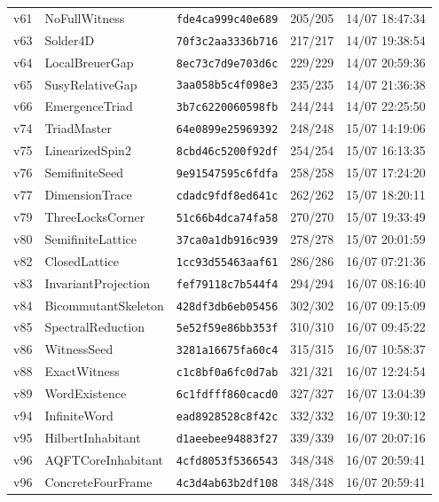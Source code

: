 \documentclass[11pt]{article}
\theoremstyle{definition}\newtheorem{deriv}{Derivação}
\begin{document}
{\begin{longtable}{@{}lllll@{}}
v61 & NoFullWitness & \texttt{fde4ca999c40e689} & 205/205 & 14/07 18:47:34 \\
v63 & Solder4D & \texttt{70f3c2aa3336b716} & 217/217 & 14/07 19:38:54 \\
v64 & LocalBreuerGap & \texttt{8ec73c7d9e703d6c} & 229/229 & 14/07 20:59:36 \\
v65 & SusyRelativeGap & \texttt{3aa058b5c4f098e3} & 235/235 & 14/07 21:36:38 \\
v66 & EmergenceTriad & \texttt{3b7c6220060598fb} & 244/244 & 14/07 22:25:50 \\
v74 & TriadMaster & \texttt{64e0899e25969392} & 248/248 & 15/07 14:19:06 \\
v75 & LinearizedSpin2 & \texttt{8cbd46c5200f92df} & 254/254 & 15/07 16:13:35 \\
v76 & SemifiniteSeed & \texttt{9e91547595c6fdfa} & 258/258 & 15/07 17:24:20 \\
v77 & DimensionTrace & \texttt{cdadc9fdf8ed641c} & 262/262 & 15/07 18:20:11 \\
v79 & ThreeLocksCorner & \texttt{51c66b4dca74fa58} & 270/270 & 15/07 19:33:49 \\
v80 & SemifiniteLattice & \texttt{37ca0a1db916c939} & 278/278 & 15/07 20:01:59 \\
v82 & ClosedLattice & \texttt{1cc93d55463aaf61} & 286/286 & 16/07 07:21:36 \\
v83 & InvariantProjection & \texttt{fef79118c7b544f4} & 294/294 & 16/07 08:16:40 \\
v84 & BicommutantSkeleton & \texttt{428df3db6eb05456} & 302/302 & 16/07 09:15:09 \\
v85 & SpectralReduction & \texttt{5e52f59e86bb353f} & 310/310 & 16/07 09:45:22 \\
v86 & WitnessSeed & \texttt{3281a16675fa60c4} & 315/315 & 16/07 10:58:37 \\
v88 & ExactWitness & \texttt{c1c8bf0a6fc0d7ab} & 321/321 & 16/07 12:24:54 \\
v89 & WordExistence & \texttt{6c1fdfff860cacd0} & 327/327 & 16/07 13:04:39 \\
v94 & InfiniteWord & \texttt{ead8928528c8f42c} & 332/332 & 16/07 19:30:12 \\
v95 & HilbertInhabitant & \texttt{d1aeebee94883f27} & 339/339 & 16/07 20:07:16 \\
v96 & AQFTCoreInhabitant & \texttt{4cfd8053f5366543} & 348/348 & 16/07 20:59:41 \\
v96 & ConcreteFourFrame & \texttt{4c3d4ab63b2df108} & 348/348 & 16/07 20:59:41 \\

\end{longtable}}
\end{document}
